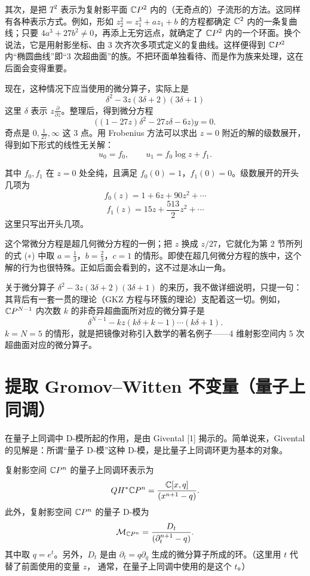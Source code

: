 其次，是把 $T^2$ 表示为复射影平面 $\mathbb{C}P^2$ 内的（无奇点的）子流形的方法。这同样有各种表示方式。例如，形如 $z_2^2=z_1^3+az_1+b$ 的方程都确定 $\mathbb{C}^2$ 内的一条复曲线；只要 $4a^3+27b^2\neq0$，再添上无穷远点，就确定了 $\mathbb{C}P^2$ 内的一个环面。换个说法，它是用射影坐标、由 3 次齐次多项式定义的复曲线。这样便得到 $\mathbb{C}P^2$ 内“椭圆曲线”即“3 次超曲面”的族。不把环面单独看待、而是作为族来处理，这在后面会变得重要。

现在，这种情况下应当使用的微分算子，实际上是
\[
\delta^2-3z(3\delta+2)(3\delta+1)
\]
这里 $\delta$ 表示 $z\frac{\partial}{\partial z}$。整理后，得到微分方程
\[
\bigl((1-27z)\delta^2-27z\delta-6z\bigr)y=0 .
\]
奇点是 $0,\frac{1}{27},\infty$ 这 3 点。用 Frobenius 方法可以求出 $z=0$ 附近的解的级数展开，得到如下形式的线性无关解：
\[
u_0=f_0,\qquad u_1=f_0\log z+f_1 .
\]

其中 $f_0,f_1$ 在 $z=0$ 处全纯，且满足 $f_0(0)=1$，$f_1(0)=0$。级数展开的开头几项为
\[
f_0(z)=1+6z+90z^2+\cdots
\]
\[
f_1(z)=15z+\frac{513}{2}z^2+\cdots
\]
这里只写出开头几项。

这个常微分方程是超几何微分方程的一例；把 $z$ 换成 $z/27$，它就化为第 2 节所列的式 (∗) 中取 $a=\frac{1}{3}$，$b=\frac{2}{3}$，$c=1$ 的情形。即使在超几何微分方程的族中，这个解的行为也很特殊。正如后面会看到的，这不过是冰山一角。

关于微分算子 $\delta^2-3z(3\delta+2)(3\delta+1)$ 的来历，我不做详细说明，只提一句：其背后有一套一贯的理论（GKZ 方程与环簇的理论）支配着这一切。例如，$\mathbb{C}P^{N-1}$ 内次数 $k$ 的非奇异超曲面所对应的微分算子是
\[
\delta^{N-1}-kz(k\delta+k-1)\cdots(k\delta+1) .
\]
$k=N=5$ 的情形，就是把镜像对称引入数学的著名例子——4 维射影空间内 5 次超曲面对应的微分算子。

\section{提取 Gromov--Witten 不变量（量子上同调）}

在量子上同调中 D-模所起的作用，是由 Givental [1] 揭示的。简单说来，Givental 的见解是：所谓“量子 D-模”这种 D-模，是比量子上同调环更为基本的对象。

复射影空间 $\mathbb{C}P^n$ 的量子上同调环表示为
\[
QH^*\mathbb{C}P^n=\frac{\mathbb{C}[x,q]}{(x^{n+1}-q)} .
\]
此外，复射影空间 $\mathbb{C}P^n$ 的量子 D-模为
\[
\mathcal{M}_{\mathbb{C}P^n}=\frac{D_t}{(\partial_t^{n+1}-q)} .
\]
其中取 $q=e^t$。另外，$D_t$ 是由 $\partial_t=q\partial_q$ 生成的微分算子所成的环。（这里用 $t$ 代替了前面使用的变量 $z$，
通常，在量子上同调中使用的是这个 $t$。）

